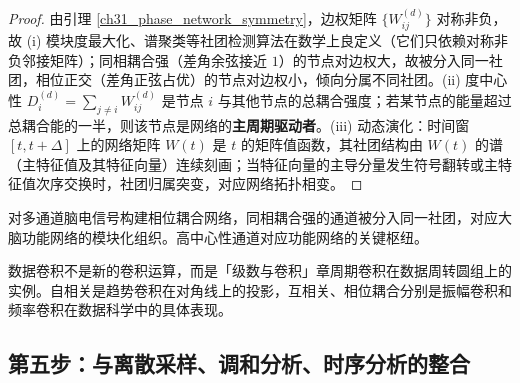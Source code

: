 \begin{proof}
由引理 \ref{ch31_phase_network_symmetry}，边权矩阵 $\{W_{ij}^{(d)}\}$ 对称非负，故 (i) 模块度最大化、谱聚类等社团检测算法在数学上良定义（它们只依赖对称非负邻接矩阵）；同相耦合强（差角余弦接近 $1$）的节点对边权大，故被分入同一社团，相位正交（差角正弦占优）的节点对边权小，倾向分属不同社团。(ii) 度中心性 $D_i^{(d)} = \sum_{j \neq i} W_{ij}^{(d)}$ 是节点 $i$ 与其他节点的总耦合强度；若某节点的能量超过总耦合能的一半，则该节点是网络的\textbf{主周期驱动者}。(iii) 动态演化：时间窗 $[t, t+\Delta]$ 上的网络矩阵 $W(t)$ 是 $t$ 的矩阵值函数，其社团结构由 $W(t)$ 的谱（主特征值及其特征向量）连续刻画；当特征向量的主导分量发生符号翻转或主特征值次序交换时，社团归属突变，对应网络拓扑相变。
\end{proof}

\begin{example}[相位耦合网络实例]\label{ex:phase_network}
对多通道脑电信号构建相位耦合网络，同相耦合强的通道被分入同一社团，对应大脑功能网络的模块化组织。高中心性通道对应功能网络的关键枢纽。
\end{example}

\begin{remark}[数据卷积与周期卷积的关系]\label{rem:data_convolution_relation}
数据卷积不是新的卷积运算，而是「级数与卷积」章周期卷积在数据周转圆组上的实例。自相关是趋势卷积在对角线上的投影，互相关、相位耦合分别是振幅卷积和频率卷积在数据科学中的具体表现。
\end{remark}

\subsection{第五步：与离散采样、调和分析、时序分析的整合}

